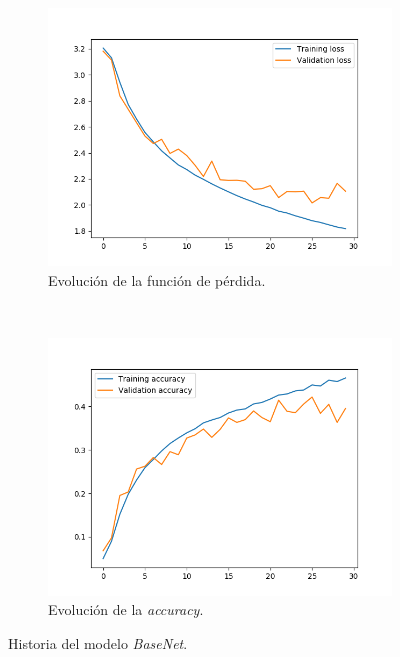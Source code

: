 \documentclass[11pt,a4paper]{article}
\begin{document}
\begin{figure}[H]
  \centering
  \begin{subfigure}[t]{0.5\textwidth}
    \includegraphics[scale=0.42]{img/base-model-loss.png}
    \caption{Evolución de la función de pérdida.}
    \label{fig:base-model-loss}
  \end{subfigure}%
  ~ \quad
  \begin{subfigure}[t]{0.5\textwidth}
    \includegraphics[scale=0.42]{img/base-model-acc.png}
    \caption{Evolución de la \textit{accuracy}.}
    \label{fig:base-model-acc}
  \end{subfigure}
  \caption{Historia del modelo \textit{BaseNet}.}
  \label{fig:basenet-history}
\end{figure}
\end{document}
